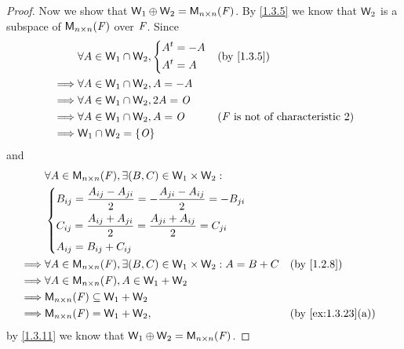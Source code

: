\begin{proof}
  Now we show that \(\mathsf{W}_1 \oplus \mathsf{W}_2 = \mathsf{M}_{{n} \times n}({\mathit{F}})\).
  By \cref{1.3.5} we know that \(\mathsf{W}_2\) is a subspace of \(\mathsf{M}_{{n} \times n}({\mathit{F}})\) over \(\mathit{F}\).
  Since
  \begin{align*}
             & \forall A \in \W_1 \cap \W_2, \begin{dcases}
      \tp{A} = -A \\
      \tp{A} = A
    \end{dcases} &  & \text{(by \cref{1.3.5})}                       \\
    \implies & \forall A \in \W_1 \cap \W_2, A = -A                                                                         \\
    \implies & \forall A \in \W_1 \cap \W_2, 2A = \zm                                                                       \\
    \implies & \forall A \in \W_1 \cap \W_2, A = \zm                    &  & \text{(\(\F\) is not of characteristic \(2\))} \\
    \implies & \W_1 \cap \W_2 = \set{\zm}
  \end{align*}
  and
  \begin{align*}
             & \forall A \in \ms{n}{n}{\F}, \exists (B, C) \in \W_1 \times \W_2 :                                                \\
             & \begin{dcases}
      B_{i j} = \frac{A_{i j} - A_{j i}}{2} = - \frac{A_{j i} - A_{i j}}{2} = -B_{j i} \\
      C_{i j} = \frac{A_{i j} + A_{j i}}{2} = \frac{A_{j i} + A_{i j}}{2} = C_{j i}    \\
      A_{i j} = B_{i j} + C_{i j}
    \end{dcases}                                                                                        \\
    \implies & \forall A \in \ms{n}{n}{\F}, \exists (B, C) \in \W_1 \times \W_2 : A = B + C &  & \text{(by \cref{1.2.8})}        \\
    \implies & \forall A \in \ms{n}{n}{\F}, A \in \W_1 + \W_2                                                                    \\
    \implies & \ms{n}{n}{\F} \subseteq \W_1 + \W_2                                                                               \\
    \implies & \ms{n}{n}{\F} = \W_1 + \W_2,                                                 &  & \text{(by \cref{ex:1.3.23}(a))}
  \end{align*}
  by \cref{1.3.11} we know that \(\mathsf{W}_1 \oplus \mathsf{W}_2 = \mathsf{M}_{{n} \times n}({\mathit{F}})\).
\end{proof}

